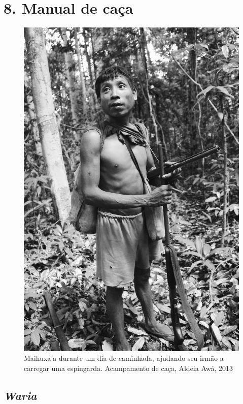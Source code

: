 
\chapter{8. Manual de caça}\label{manual-de-cauxe7a}

\begin{figure}[H]
\centering
  \includegraphics[width=\textwidth]{./imgs/IMG_1553}
\caption{Maihuxa’a durante um dia de caminhada, ajudando seu irmão a carregar uma espingarda. Acampamento de caça, Aldeia Awá, 2013}
\end{figure}

\section{\emph{Waria}}\label{waria}

